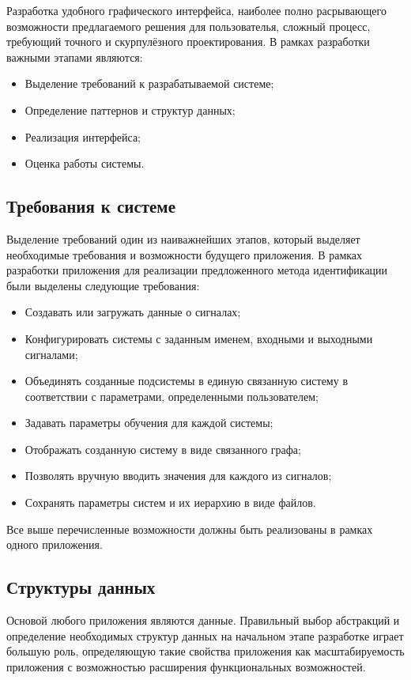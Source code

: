 Разработка удобного графического интерфейса, наиболее полно расрывающего
возможности предлагаемого решения для пользователья, сложный процесс, требующий
точного и скурпулёзного проектирования. В рамках разработки важными этапами
являются:

\begin{itemize}
  \item Выделение требований к разрабатываемой системе;
  \item Определение паттернов и структур данных;
  \item Реализация интерфейса;
  \item Оценка работы системы.
\end{itemize}

\subsection{Требования к системе}

Выделение требований один из наиважнейших этапов, который выделяет необходимые
требования и возможности будущего приложения. В рамках разработки приложения для
реализации предложенного метода идентификации были выделены следующие
требования:

\begin{itemize}
  \item Создавать или загружать данные о сигналах;
  \item Конфигурировать системы с заданным именем, входными и выходными
    сигналами;
  \item Объединять созданные подсистемы в единую связанную систему в
    соответствии с параметрами, определенными пользователем;
  \item Задавать параметры обучения для каждой системы;
  \item Отображать созданную систему в виде связанного графа;
  \item Позволять вручную вводить значения для каждого из сигналов;
  \item Сохранять параметры систем и их иерархию в виде файлов.
\end{itemize}

Все выше перечисленные возможности должны быть реализованы в рамках одного
приложения.


\subsection{Структуры данных}
Основой любого приложения являются данные. Правильный выбор абстракций и
определение необходимых структур данных на начальном этапе разработке играет
большую роль, определяющую такие свойства приложения как масштабируемость
приложения с возможностью расширения функциональных возможностей. 

